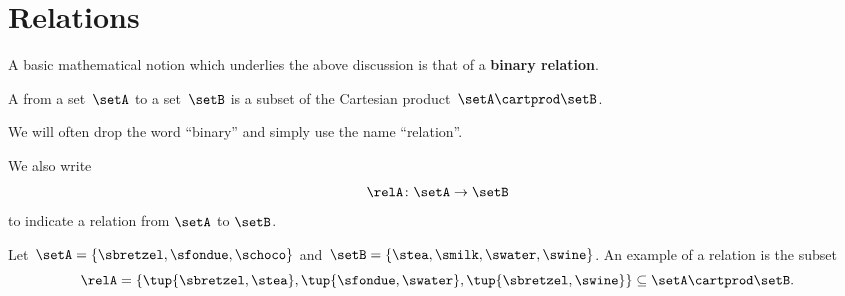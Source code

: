 
\section{Relations}
\label{sec:connection-relations}
A basic mathematical notion which underlies the above discussion is that of a \textbf{binary relation}.

\begin{ctdefinition}
	\label{def:binary-relation}
	A \emph{} from a set~$\setA$ to a set~$\setB$ is a subset of the Cartesian product~$\setA\cartprod \setB$.
\end{ctdefinition}

We will often drop the word ``binary'' and simply use the name ``relation''.

We also write
\begin{equation}
	\relA \colon \setA \to \setB
\end{equation}
to indicate a relation from $\setA$ to $\setB$.

\begin{marginfigure}
	\centering
	\caption{}
	\label{fig:example_rel}
\end{marginfigure}

\begin{example}
	\label{exa:simple-rel}
	Let~$\setA = \{ \sbretzel, \sfondue, \schoco \}$ and~$\setB = \{ \stea, \smilk, \swater, \swine \}$.
	An example of a relation is the subset
	\begin{equation}
		\relA = \{ \tup{\sbretzel, \stea}, \tup{\sfondue, \swater}, \tup{\sbretzel, \swine} \} \subseteq \setA \cartprod \setB.
	\end{equation}
\end{example}

